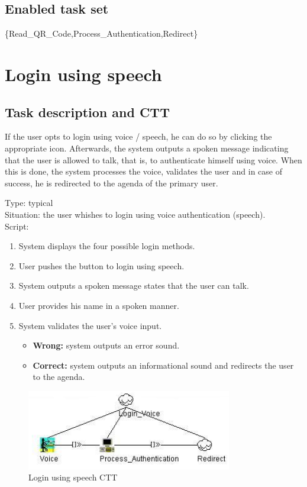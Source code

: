 \documentclass[11pt, a4paper,svglistings]{report}
\begin{document}
\subsection{Enabled task set}

\{Read\_QR\_Code,Process\_Authentication,Redirect\}


\newpage

\section{\label{subsec:loginSpeech}Login using speech}

\subsection{Task description and CTT}

If the user opts to login using voice / speech, he can do so by clicking the appropriate icon. Afterwards, the system outputs a spoken message indicating that the user is allowed to talk, that is, to authenticate himself using voice. When this is done, the system processes the voice, validates the user and in case of success, he is redirected to the agenda of the primary user.

Type: typical \\
Situation: the user whishes to login using voice authentication (speech). \\
Script:
\begin{enumerate}
\item System displays the four possible login methods.
\item User pushes the button to login using speech.
\item System outputs a spoken message states that the user can talk.
\item User provides his name in a spoken manner.
\item System validates the user's voice input.
\begin{itemize}
\item \textbf{Wrong:} system outputs an error sound.
\item \textbf{Correct:} system outputs an informational sound and redirects the user to the agenda.
\end{itemize}
\end{enumerate}

\begin{figure}[H]
\centering
    \includegraphics[width=0.8\textwidth]{LoginVoice.png}
  \caption[Speech CTT]{\label{fig:Logout}Login using speech CTT}
\end{figure}
\end{document}
